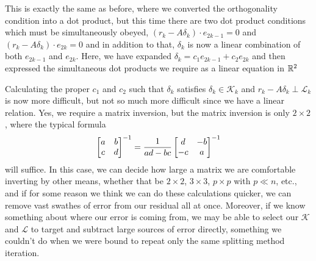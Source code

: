 \documentclass[11pt]{article}
\begin{document}
This is exactly the same as before, where we converted the orthogonality condition into a dot product, but this time there are two dot product conditions which must be simultaneously obeyed, $(r_k - A \delta_k) \cdot e_{2k-1} = 0$ and $(r_k - A \delta_k) \cdot e_{2k} = 0$ and in addition to that, $\delta_k$ is now a linear combination of both $e_{2k-1}$ and $e_{2k}$. Here, we have expanded $\delta_k = c_1 e_{2k-1} + c_2 e_{2k}$ and then expressed the simultaneous dot products we require as a linear equation in $\mathbb{R}^2$

Calculating the proper $c_1$ and $c_2$ such that $\delta_k$ satisfies $\delta_k \in \mathcal{K}_k$ and $r_k - A\delta_k \perp \mathcal{L}_k$ is now more difficult, but not so much more difficult since we have a linear relation. Yes, we require a matrix inversion, but the matrix inversion is only $2 \times 2$, where the typical formula \begin{gather*}
\begin{bmatrix} a & b \\ c & d\end{bmatrix} ^ {-1} = \frac{1}{ad - bc} \begin{bmatrix} d & -b \\ -c & a\end{bmatrix} ^ {-1}
\end{gather*}
will suffice. In this case, we can decide how large a matrix we are comfortable inverting by other means, whether that be $2\times 2$, $3 \times 3$, $p \times p$ with $p \ll n$, etc., and if for some reason we think we can do these calculations quicker, we can remove vast swathes of error from our residual all at once. Moreover, if we know something about where our error is coming from, we may be able to select our $\mathcal{K}$ and $\mathcal{L}$ to target and subtract large sources of error directly, something we couldn't do when we were bound to repeat only the same splitting method iteration.
\end{document}
